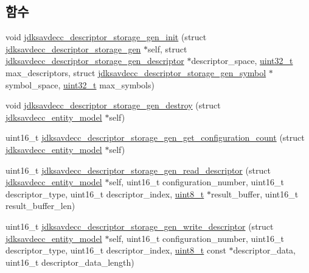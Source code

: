 \subsection*{함수}
\begin{DoxyCompactItemize}
\item 
void \hyperlink{group__descriptor__storage__gen_ga8a50f3d757bad2c3f8375388d29281ab}{jdksavdecc\+\_\+descriptor\+\_\+storage\+\_\+gen\+\_\+init} (struct \hyperlink{structjdksavdecc__descriptor__storage__gen}{jdksavdecc\+\_\+descriptor\+\_\+storage\+\_\+gen} $\ast$self, struct \hyperlink{structjdksavdecc__descriptor__storage__gen__descriptor}{jdksavdecc\+\_\+descriptor\+\_\+storage\+\_\+gen\+\_\+descriptor} $\ast$descriptor\+\_\+space, \hyperlink{parse_8c_a6eb1e68cc391dd753bc8ce896dbb8315}{uint32\+\_\+t} max\+\_\+descriptors, struct \hyperlink{structjdksavdecc__descriptor__storage__gen__symbol}{jdksavdecc\+\_\+descriptor\+\_\+storage\+\_\+gen\+\_\+symbol} $\ast$symbol\+\_\+space, \hyperlink{parse_8c_a6eb1e68cc391dd753bc8ce896dbb8315}{uint32\+\_\+t} max\+\_\+symbols)
\item 
void \hyperlink{group__descriptor__storage__gen_ga5a90df4758390e1aedfec022682d7a85}{jdksavdecc\+\_\+descriptor\+\_\+storage\+\_\+gen\+\_\+destroy} (struct \hyperlink{structjdksavdecc__entity__model}{jdksavdecc\+\_\+entity\+\_\+model} $\ast$self)
\item 
uint16\+\_\+t \hyperlink{group__descriptor__storage__gen_ga19a5578148ed868f6a4cc420996a0164}{jdksavdecc\+\_\+descriptor\+\_\+storage\+\_\+gen\+\_\+get\+\_\+configuration\+\_\+count} (struct \hyperlink{structjdksavdecc__entity__model}{jdksavdecc\+\_\+entity\+\_\+model} $\ast$self)
\item 
uint16\+\_\+t \hyperlink{group__descriptor__storage__gen_gaf1fb5c2fa2926b8b04d3fa336238dffb}{jdksavdecc\+\_\+descriptor\+\_\+storage\+\_\+gen\+\_\+read\+\_\+descriptor} (struct \hyperlink{structjdksavdecc__entity__model}{jdksavdecc\+\_\+entity\+\_\+model} $\ast$self, uint16\+\_\+t configuration\+\_\+number, uint16\+\_\+t descriptor\+\_\+type, uint16\+\_\+t descriptor\+\_\+index, \hyperlink{stdint_8h_aba7bc1797add20fe3efdf37ced1182c5}{uint8\+\_\+t} $\ast$result\+\_\+buffer, uint16\+\_\+t result\+\_\+buffer\+\_\+len)
\item 
uint16\+\_\+t \hyperlink{group__descriptor__storage__gen_gafa0516a69ae813b63f6ec0183a98b973}{jdksavdecc\+\_\+descriptor\+\_\+storage\+\_\+gen\+\_\+write\+\_\+descriptor} (struct \hyperlink{structjdksavdecc__entity__model}{jdksavdecc\+\_\+entity\+\_\+model} $\ast$self, uint16\+\_\+t configuration\+\_\+number, uint16\+\_\+t descriptor\+\_\+type, uint16\+\_\+t descriptor\+\_\+index, \hyperlink{stdint_8h_aba7bc1797add20fe3efdf37ced1182c5}{uint8\+\_\+t} const $\ast$descriptor\+\_\+data, uint16\+\_\+t descriptor\+\_\+data\+\_\+length)

\end{DoxyCompactItemize}
